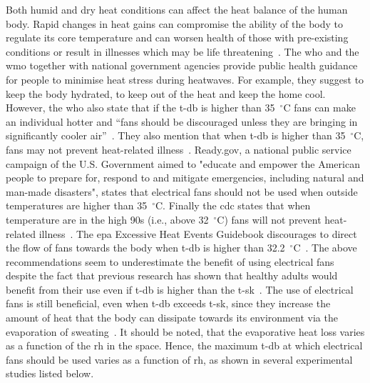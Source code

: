Both humid and dry heat conditions can affect the heat balance of the human body.
Rapid changes in heat gains can compromise the ability of the body to regulate its core temperature and can worsen health of those with pre-existing conditions or result in illnesses which may be life threatening~\cite{WMO2015}.
The \ac{who} and the \ac{wmo} together with national government agencies provide public health guidance for people to minimise heat stress during heatwaves.
For example, they suggest to keep the body hydrated, to keep out of the heat and keep the home cool.
However, the \ac{who} also state that if the \ac{t-db} is higher than 35~$^{\circ}$C fans can make an individual hotter and ``fans should be discouraged unless they are bringing in significantly cooler air''~\cite{WMO2015}.
They also mention that when \ac{t-db} is higher than 35~$^{\circ}$C, fans may not prevent heat-related illness~\cite{HeatandH28:online}.
Ready.gov, a national public service campaign of the U.S. Government aimed to "educate and empower the American people to prepare for, respond to and mitigate emergencies, including natural and man-made disasters", states that electrical fans should not be used when outside temperatures are higher than 35~$^{\circ}$C.
Finally the \ac{cdc} states that when temperature are in the high 90s (i.e., above 32~$^{\circ}$C) fans will not prevent heat-related illness~\cite{ExtremeH66:online}.
The \ac{epa} Excessive Heat Events Guidebook discourages to direct the flow of fans towards the body when \ac{t-db} is higher than 32.2~$^{\circ}$C~\cite{UnitedStatesEnvironmentalProtectionAgency2006}.
The above recommendations seem to underestimate the benefit of using electrical fans despite the fact that previous research has shown that healthy adults would benefit from their use even if \ac{t-db} is higher than the \ac{t-sk}~\cite{Rate2015, Jay2015, Jay2019a, Rate2015, Gagnon2017}.
The use of electrical fans is still beneficial, even when \ac{t-db} exceeds \ac{t-sk}, since they increase the amount of heat that the body can dissipate towards its environment via the evaporation of sweating~\cite{Jay2015}.
It should be noted, that the evaporative heat loss varies as a function of the \ac{rh} in the space.
Hence, the maximum \ac{t-db} at which electrical fans should be used varies as a function of \ac{rh}, as shown in several experimental studies listed below.

